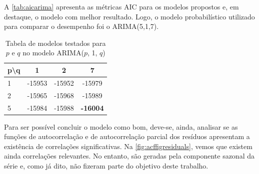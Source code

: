 \documentclass[
    12pt,
    oneside,
    a4paper,
    english,
    brazil
]{abntex2}
\begin{document}
A \autoref{tab:aicarima} apresenta as métricas  AIC para os modelos propostos e,
em  destaque,  o modelo  com  melhor  resultado.  Logo, o  modelo  probabilístico
utilizado para comparar o desempenho foi o ARIMA(5,1,7).

\begin{table}[ht]
\centering
    \caption{Tabela de modelos testados para $p$ e $q$ no modelo ARIMA($p$, 1, $q$)}\label{tab:aicarima}
\begin{tabular}{l c c c}
    p\textbackslash{}q  & 1      & 2      & 7               \\
    \toprule
    1                   & -15953 & -15952 & -15979          \\
    2                   & -15965 & -15968 & -15989          \\
    5                   & -15984 & -15988 & \textbf{-16004} \\
\end{tabular}
\end{table}

Para ser possível concluir o modelo como bom, deve-se, ainda, analisar se as funções
de autocorrelação e de autocorrelação parcial  dos resíduos apresentam a existência
de  correlações  significativas.  Na  \autoref{fig:acffigresiduals},  vemos  que
existem ainda correlações  relevantes. No entanto, são  geradas pela componente
sazonal da série e, como já dito, não fizeram parte do objetivo deste trabalho.
\end{document}
